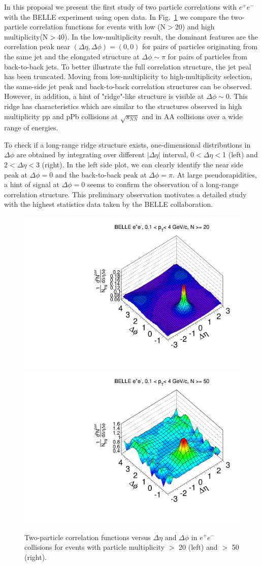 In this proposal we present the first study of two particle correlations with $e^{+}e^{-}$ with the BELLE experiment using open data.
In Fig.~\ref{fig:ridgeBelle} we compare the two-particle correlation functions for events with low (N$>$20) and high multiplicity(N$>40$). 
In the low-multiplicity result, the dominant features are the correlation peak near $(\Delta\eta,\Delta\phi)=(0,0)$ for pairs of particles originating from the same jet 
and the elongated structure at $\Delta\phi\sim\pi$ for pairs of particles from back-to-back jets. To better illustrate the full correlation structure, the jet peal has been truncated.
Moving from low-multiplicity to high-multiplicity selection, the same-side jet peak and back-to-back correlation structures can be observed. 
However, in addition, a hint of "ridge"-like structure is visible at $\Delta\phi \sim$0. This ridge has characteristics which are similar to the structures
observed in high multiplicity pp and pPb collisions at $\sqrt{s_{NN}}$ and in AA collisions over a wide range of energies.

To check if a long-range ridge structure exists, one-dimensional distributions in $\Delta\phi$ are obtained by integrating over different $|\Delta\eta|$ interval, 0$<\Delta \eta<$1 (left) and 
2$<\Delta \eta<$3 (right). In the left side plot, we can clearly identify the near side peak at $\Delta\phi=$0 and the back-to-back peak at $\Delta\phi=\pi$. At large pseudorapidities, 
a hint of signal at $\Delta\phi=0$ seems to confirm the observation of a long-range correlation structure. This preliminary observation motivates a detailed study with the highest 
statistics data taken by the BELLE collaboration. 

\begin{figure}[!htb]
\begin{center}
\includegraphics[width=.45\textwidth]{figures/canvasRidgeBelleMult20CutHigh0.pdf}
\includegraphics[width=.45\textwidth]{figures/canvasRidgeBelleMult50CutHigh0.pdf}
\caption{Two-particle correlation functions versus $\Delta\eta$ and $\Delta\phi$ in $e^{+}e^{-}$ collisions for events with particle multiplicity $>$ 20 (left) and  $>$ 50 (right).}
\label{fig:ridgeBelle} 
\end{center}
\end{figure}

